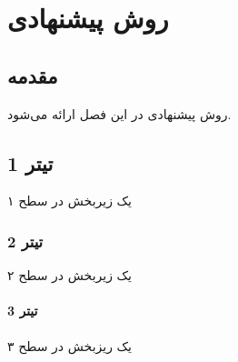
\chapter{روش پیشنهادی}\label{ch:3}
\section{مقدمه}\label{sec:3:1}
روش پیشنهادی در این فصل ارائه می‌شود.
\section{تیتر 1}\label{sec:3:2}
یک زیربخش در سطح ۱
\subsection{تیتر 2}\label{sec:3:2:1}
یک زیربخش در سطح ۲
\subsubsection{تیتر 3}\label{sec:3:2:1:1}
یک ریزبخش در سطح ۳
